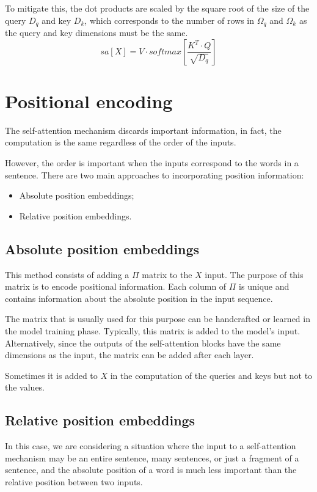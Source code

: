 To mitigate this, the dot products are scaled by the square root of the size of the query $D_q$ and key $D_k$, which 
corresponds to the number of rows in $\Omega_q$ and $\Omega_k$ as the query and key dimensions must be the same.
\begin{equation}
    sa[X] = V \cdot softmax\left[\frac{K^T \cdot Q}{\sqrt{D_q}}\right]
\end{equation}

\section{Positional encoding}
The self-attention mechanism discards important information, in fact, the computation is the same regardless of the order 
of the inputs. 

However, the order is important when the inputs correspond to the words in a sentence. There are two main approaches to 
incorporating position information: 
\begin{itemize}
    \item Absolute position embeddings;
    \item Relative position embeddings.
\end{itemize}
\subsection{Absolute position embeddings}
This method consists of adding a $\Pi$ matrix to the $X$ input. The purpose of this matrix is to encode positional
information. Each column of $\Pi$ is unique and contains information about the absolute position in the input sequence. 

The matrix that is usually used for this purpose can be handcrafted or learned in the model training phase. 
Typically, this matrix is added to the model's input. Alternatively, since the outputs of the self-attention blocks have
the same dimensions as the input, the matrix can be added after each layer.

\begin{note}
    Sometimes it is added to $X$ in the computation of the queries and keys but not to the values.
\end{note}

\subsection{Relative position embeddings}
In this case, we are considering a situation where the input to a self-attention mechanism may be an entire sentence, 
many sentences, or just a fragment of a sentence, and the absolute position of a word is much less important than the 
relative position between two inputs.

